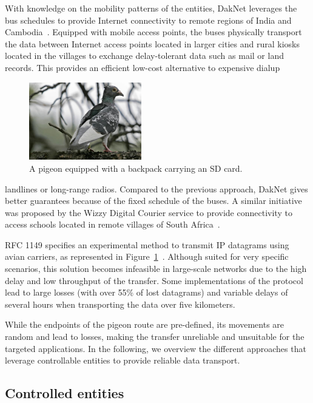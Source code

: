 With knowledge on the mobility patterns of the entities, DakNet leverages the bus schedules to provide Internet connectivity to remote regions of India and Cambodia~\cite{pentland2004daknet}. Equipped with mobile access points, the buses physically transport the data between Internet access points located in larger cities and rural kiosks located in the villages to exchange delay-tolerant data such as mail or land records. This provides an efficient low-cost alternative to expensive dialup 
\begin{figure}
    \vspace{-10pt}
    \includegraphics[width=4.9cm]{figures/pigeon.jpg}
    \caption{A pigeon equipped with a backpack carrying an SD card.}
    \label{fig:pigeon}
\end{figure}
landlines or long-range radios. Compared to the previous approach, DakNet gives better guarantees because of the fixed schedule of the buses. A similar initiative was proposed by the Wizzy Digital Courier service to provide connectivity to access schools located in remote villages of South Africa~\cite{rabagliati2004wizzy}.

RFC 1149 specifies an experimental method to transmit IP datagrams using avian carriers, as represented in Figure~\ref{fig:pigeon}~\cite{rfc1149}. Although suited for very specific scenarios, this solution becomes infeasible in large-scale networks due to the high delay and low throughput of the transfer. Some implementations of the protocol lead to large losses (with over 55\% of lost datagrams) and variable delays of several hours when transporting the data over five kilometers.

While the endpoints of the pigeon route are pre-defined, its movements are random and lead to losses, making the transfer unreliable and unsuitable for the targeted applications. In the following, we overview the different approaches that leverage controllable entities to provide reliable data transport.

\clearpage
\subsection{Controlled entities}
\label{sec:direct-control}

